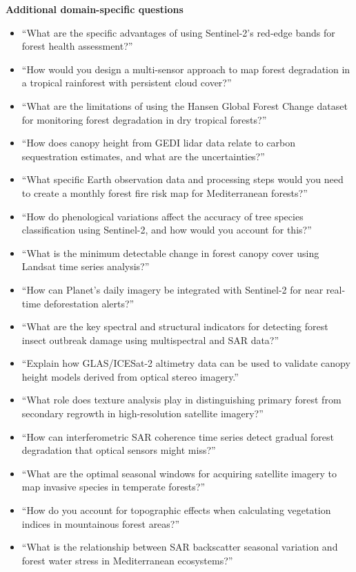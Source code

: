 \noindent\textbf{Additional domain-specific questions}
\begin{itemize}
\item ``What are the specific advantages of using Sentinel-2's red-edge bands for forest health assessment?''
\item ``How would you design a multi-sensor approach to map forest degradation in a tropical rainforest with persistent cloud cover?''
\item ``What are the limitations of using the Hansen Global Forest Change dataset for monitoring forest degradation in dry tropical forests?''
\item ``How does canopy height from GEDI lidar data relate to carbon sequestration estimates, and what are the uncertainties?''
\item ``What specific Earth observation data and processing steps would you need to create a monthly forest fire risk map for Mediterranean forests?''
\item ``How do phenological variations affect the accuracy of tree species classification using Sentinel-2, and how would you account for this?''
\item ``What is the minimum detectable change in forest canopy cover using Landsat time series analysis?''
\item ``How can Planet's daily imagery be integrated with Sentinel-2 for near real-time deforestation alerts?''
\item ``What are the key spectral and structural indicators for detecting forest insect outbreak damage using multispectral and SAR data?''
\item ``Explain how GLAS/ICESat-2 altimetry data can be used to validate canopy height models derived from optical stereo imagery.''
\item ``What role does texture analysis play in distinguishing primary forest from secondary regrowth in high-resolution satellite imagery?''
\item ``How can interferometric SAR coherence time series detect gradual forest degradation that optical sensors might miss?''
\item ``What are the optimal seasonal windows for acquiring satellite imagery to map invasive species in temperate forests?''
\item ``How do you account for topographic effects when calculating vegetation indices in mountainous forest areas?''
\item ``What is the relationship between SAR backscatter seasonal variation and forest water stress in Mediterranean ecosystems?''
\end{itemize}

